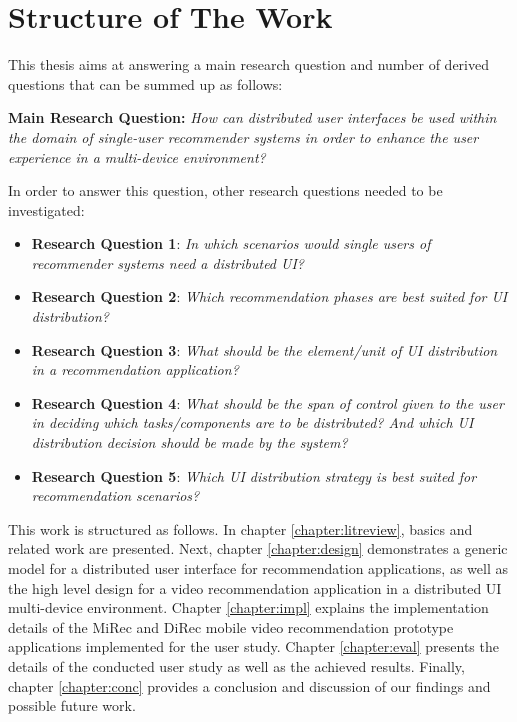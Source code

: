 \section{Structure of The Work}
This thesis aims at answering a main research question and number of derived
questions that can be summed up as follows:\par
\textbf{Main Research Question:} \textit{How can distributed user interfaces be
used within the domain of single-user recommender systems in order to enhance
the user experience in a multi-device environment? }\par
In order to answer this question, other research questions needed to be
investigated:
\begin{itemize}
\item \textbf{Research Question 1}: \textit{In which scenarios would single
users of recommender systems need a distributed UI?}
\item \textbf{Research Question 2}: \textit{Which recommendation phases are best
suited for UI distribution?}
\item \textbf{Research Question 3}: \textit{What should be the element/unit of
UI distribution in a recommendation application?}
\item \textbf{Research Question 4}: \textit{What should be the span of control
given to the user in deciding which tasks/components are to be distributed?
And which UI distribution decision should be made by the system?}
\item \textbf{Research Question 5}: \textit{Which UI distribution strategy is
best suited for recommendation scenarios?}
\end{itemize}

This work is structured as follows. In chapter \ref{chapter:litreview}, basics
and related work are presented. Next, chapter \ref{chapter:design} demonstrates
a generic model for a distributed user interface for recommendation
applications, as well as the high level design for a video recommendation
application in a distributed UI multi-device environment.
Chapter \ref{chapter:impl} explains the implementation details of the MiRec and
DiRec mobile video recommendation prototype applications implemented for the
user study. Chapter \ref{chapter:eval} presents the details of the conducted
user study as well as the achieved results. Finally, chapter \ref{chapter:conc}
provides a conclusion and discussion of our findings and possible future work. 

